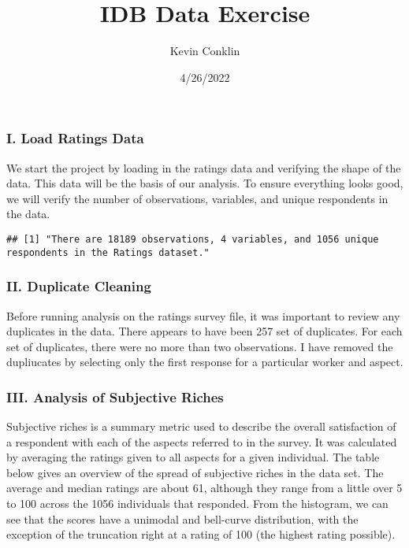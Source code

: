 \documentclass[
]{article}
\title{IDB Data Exercise}
\author{Kevin Conklin}
\date{4/26/2022}
\begin{document}
\maketitle

\hypertarget{i.-load-ratings-data}{%
\subsubsection{I. Load Ratings Data}\label{i.-load-ratings-data}}

We start the project by loading in the ratings data and verifying the
shape of the data. This data will be the basis of our analysis. To
ensure everything looks good, we will verify the number of observations,
variables, and unique respondents in the data.

\begin{verbatim}
## [1] "There are 18189 observations, 4 variables, and 1056 unique respondents in the Ratings dataset."
\end{verbatim}

\hypertarget{ii.-duplicate-cleaning}{%
\subsubsection{II. Duplicate Cleaning}\label{ii.-duplicate-cleaning}}

Before running analysis on the ratings survey file, it was important to
review any duplicates in the data. There appears to have been 257 set of
duplicates. For each set of duplicates, there were no more than two
observations. I have removed the dupliucates by selecting only the first
response for a particular worker and aspect.

\hypertarget{iii.-analysis-of-subjective-riches}{%
\subsubsection{III. Analysis of Subjective
Riches}\label{iii.-analysis-of-subjective-riches}}

Subjective riches is a summary metric used to describe the overall
satisfaction of a respondent with each of the aspects referred to in the
survey. It was calculated by averaging the ratings given to all aspects
for a given individual. The table below gives an overview of the spread
of subjective riches in the data set. The average and median ratings are
about 61, although they range from a little over 5 to 100 across the
1056 individuals that responded. From the histogram, we can see that the
scores have a unimodal and bell-curve distribution, with the exception
of the truncation right at a rating of 100 (the highest rating
possible).
\end{document}
